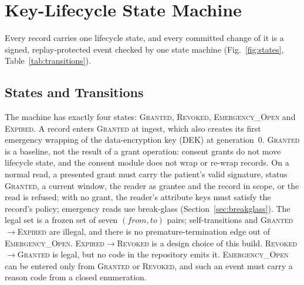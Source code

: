 \section{Key-Lifecycle State Machine}\label{sec:lifecycle}

Every record carries one lifecycle state, and every committed change of it is
a signed, replay-protected event checked by one state machine
(Fig.~\ref{fig:states}, Table~\ref{tab:transitions}).

\subsection{States and Transitions}\label{sec:lifecycle-states}

The machine has exactly four states: \textsc{Granted}, \textsc{Revoked},
\textsc{Emergency\_Open} and \textsc{Expired}.
A record enters \textsc{Granted} at ingest, which also creates its first
emergency wrapping of the data-encryption key (DEK) at generation~0.
\textsc{Granted} is a baseline, not the result of a grant operation: consent
grants do not move lifecycle state, and the consent module does not wrap or
re-wrap records.
On a normal read, a presented grant must carry the patient's valid
signature, status \textsc{Granted}, a current window, the reader as grantee
and the record in scope, or the read is refused; with no grant, the reader's
attribute keys must satisfy the record's policy; emergency reads use
break-glass (Section~\ref{sec:breakglass}).
The legal set is a frozen set of seven $(\mathit{from},\mathit{to})$ pairs;
self-transitions and \textsc{Granted}$\to$\textsc{Expired} are illegal, and
there is no premature-termination edge out of \textsc{Emergency\_Open}.
\textsc{Expired}$\to$\textsc{Revoked} is a design choice of this build.
\textsc{Revoked}$\to$\textsc{Granted} is legal, but no code in the repository
emits it.
\textsc{Emergency\_Open} can be entered only from \textsc{Granted} or
\textsc{Revoked}, and such an event must carry a reason code from a closed
enumeration.




